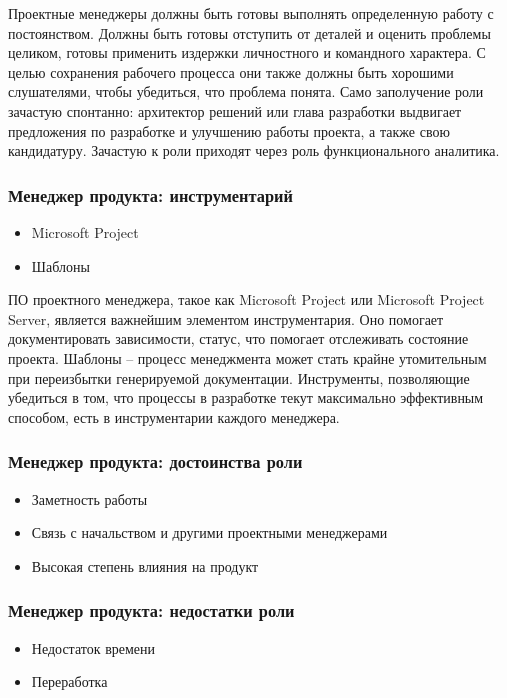 \documentclass{../industrial-development}
\begin{document}
\lecturenotes

Проектные менеджеры должны быть готовы выполнять определенную работу с постоянством. Должны быть готовы отступить от деталей и оценить проблемы целиком, готовы применить издержки личностного и командного характера. 
С целью сохранения рабочего процесса они также должны быть хорошими слушателями, чтобы убедиться, что проблема понята. 
Само заполучение роли зачастую спонтанно: архитектор решений или глава разработки выдвигает предложения по разработке и улучшению работы проекта, а также свою кандидатуру. Зачастую к роли приходят через роль функционального аналитика. 
  ~\cite{Anatomy}

\begin{frame} \frametitle{Менеджер продукта: инструментарий}
  \begin{itemize}
	\item Microsoft Project
	\item Шаблоны
	\end{itemize}
\end{frame}

\lecturenotes

ПО проектного менеджера, такое как Microsoft Project или Microsoft Project Server, является важнейшим элементом инструментария. Оно помогает документировать зависимости, статус, что помогает отслеживать состояние проекта. 
Шаблоны – процесс менеджмента может стать крайне утомительным при переизбытки генерируемой документации. Инструменты, позволяющие убедиться в том, что процессы в разработке текут максимально эффективным способом, есть в инструментарии каждого менеджера. 
  ~\cite{Anatomy}

\begin{frame} \frametitle{Менеджер продукта: достоинства роли}
  \begin{itemize}
	\item Заметность работы
	\item Связь с начальством и другими проектными менеджерами
	\item Высокая степень влияния на продукт
	\end{itemize}
\end{frame}

\begin{frame} \frametitle{Менеджер продукта: недостатки роли}
  \begin{itemize}
	\item Недостаток времени
	\item Переработка
	\end{itemize}
\end{frame}
\end{document}
